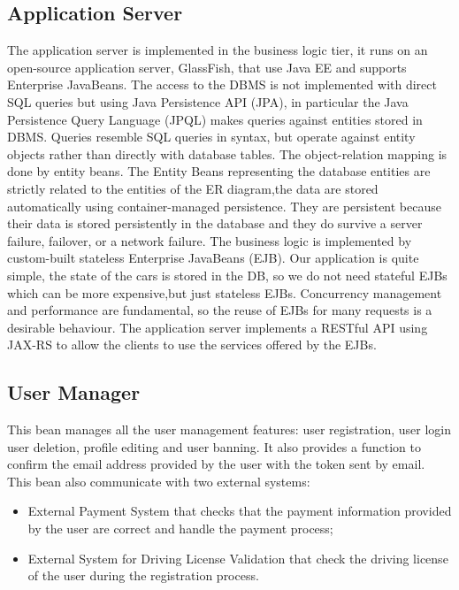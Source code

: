\subsection{Application Server}
The application server is implemented in the business logic tier, it runs on an open-source application server, GlassFish, that use Java EE and supports Enterprise JavaBeans.
The access to the DBMS is not implemented with direct SQL queries but using Java Persistence API (JPA), in particular the Java Persistence Query Language (JPQL) makes queries against entities stored in DBMS.
Queries resemble SQL queries in syntax, but operate against entity objects rather than directly with database tables.
The object-relation mapping is done by entity beans.
The Entity Beans representing the database entities are strictly related to the entities of the ER diagram,the data  are stored automatically using container-managed persistence.
They are persistent because their data is stored persistently in the database and they do survive a server failure, failover, or a network failure.
The business logic is implemented by custom-built stateless Enterprise JavaBeans (EJB).
Our application is quite simple, the state of the cars is stored in the DB, so we do not need stateful EJBs which can be more expensive,but just stateless EJBs.
Concurrency management and performance are fundamental, so the reuse of EJBs for many requests is a desirable behaviour.
The application server implements a RESTful API using JAX-RS to allow the clients to use the services offered by the EJBs.



\subsection{User Manager}
This bean manages all the user management features: user registration, user login user deletion, profile editing and user banning.
It also provides a function to confirm the email address provided by the user with the token sent by email.
This bean also communicate with two external systems:
\begin{itemize}
\item External Payment System that checks that the payment information provided by the user are correct and handle the payment process;
\item External System for Driving License Validation that check the driving license of the user during the registration process.
\end{itemize}

